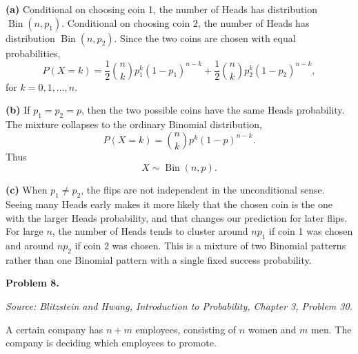 \documentclass[11pt]{article}
\newcommand{\source}[1]{%
    \vspace{0.15cm}
    {\small\textit{Source: Blitzstein and Hwang, \textit{Introduction to Probability}, Chapter 3, Problem #1.}}
}
\begin{document}
\begin{solutionbox}
\textbf{(a)} Conditional on choosing coin 1, the number of Heads has distribution $\operatorname{Bin}(n,p_1)$. Conditional on choosing coin 2, the number of Heads has distribution $\operatorname{Bin}(n,p_2)$. Since the two coins are chosen with equal probabilities,
\[
P(X=k)
=
\frac12\binom{n}{k}p_1^k(1-p_1)^{n-k}
+
\frac12\binom{n}{k}p_2^k(1-p_2)^{n-k},
\]
for $k=0,1,\ldots,n$.
 

\textbf{(b)} If $p_1=p_2=p$, then the two possible coins have the same Heads probability. The mixture collapses to the ordinary Binomial distribution,
\[
P(X=k)=\binom{n}{k}p^k(1-p)^{n-k}.
\]
Thus
\[
X\sim \operatorname{Bin}(n,p).
\]
 

\textbf{(c)} When $p_1\ne p_2$, the flips are not independent in the unconditional sense. Seeing many Heads early makes it more likely that the chosen coin is the one with the larger Heads probability, and that changes our prediction for later flips. For large $n$, the number of Heads tends to cluster around $np_1$ if coin 1 was chosen and around $np_2$ if coin 2 was chosen. This is a mixture of two Binomial patterns rather than one Binomial pattern with a single fixed success probability.
 
\end{solutionbox}
\newpage


\begin{problemheader}
\textbf{Problem 8. }
\end{problemheader}
\source{30}

A certain company has $n+m$ employees, consisting of $n$ women and $m$ men. The company is deciding which employees to promote.
\end{document}
